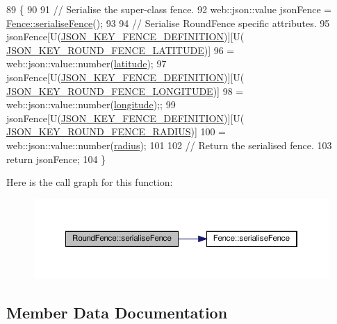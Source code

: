 \begin{DoxyCode}
89 \{
90 
91     \textcolor{comment}{// Serialise the super-class fence.}
92     web::json::value jsonFence = \hyperlink{class_fence_a5c8529e80a4444cc9ca0fb660cbf07c8}{Fence::serialiseFence}();
93 
94     \textcolor{comment}{// Serialise RoundFence specific attributes.}
95     jsonFence[U(\hyperlink{_fence_8h_a698e69a18d481c1033ae9f7d6fb2e5b6}{JSON\_KEY\_FENCE\_DEFINITION})][U(
      \hyperlink{_round_fence_8h_a129fc0ce4ddf2284b58daf8670b24848}{JSON\_KEY\_ROUND\_FENCE\_LATITUDE})]
96             = web::json::value::number(\hyperlink{class_round_fence_ad48cb4c95dab320652679bae203b7caf}{latitude});
97     jsonFence[U(\hyperlink{_fence_8h_a698e69a18d481c1033ae9f7d6fb2e5b6}{JSON\_KEY\_FENCE\_DEFINITION})][U(
      \hyperlink{_round_fence_8h_acfc741eefa291fc8d2db8b0cfb4ddaa4}{JSON\_KEY\_ROUND\_FENCE\_LONGITUDE})]
98             = web::json::value::number(\hyperlink{class_round_fence_a122cccc61f294c1fcdf7ebe944944fca}{longitude});;
99     jsonFence[U(\hyperlink{_fence_8h_a698e69a18d481c1033ae9f7d6fb2e5b6}{JSON\_KEY\_FENCE\_DEFINITION})][U(
      \hyperlink{_round_fence_8h_a40c147f826ff3297cb7eea73a4d00d43}{JSON\_KEY\_ROUND\_FENCE\_RADIUS})]
100             = web::json::value::number(\hyperlink{class_round_fence_a8e9d1a2f22df0bb718522f3ab6cd3b83}{radius});
101 
102     \textcolor{comment}{// Return the serialised fence.}
103     \textcolor{keywordflow}{return} jsonFence;
104 \}
\end{DoxyCode}
Here is the call graph for this function\+:\nopagebreak
\begin{figure}[H]
\begin{center}
\leavevmode
\includegraphics[width=350pt]{da/d8b/class_round_fence_ae9dd3e4291f7509ce557a6c28cdd682d_cgraph}
\end{center}
\end{figure}


\subsection{Member Data Documentation}
\mbox{\label{class_round_fence_ad48cb4c95dab320652679bae203b7caf}} 
